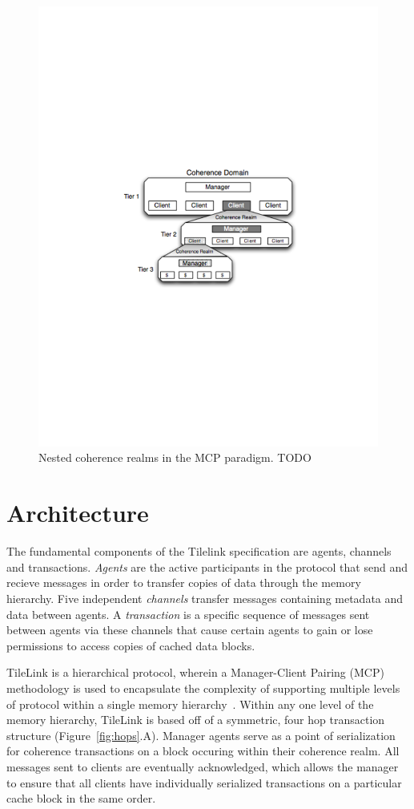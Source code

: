 \begin{figure}[t!]
\centering
\includegraphics[width=0.8\columnwidth]{tilelink/figures/mcp-realm.pdf}
\caption{Nested coherence realms in the MCP paradigm. TODO }
\label{fig:mcp}
\end{figure}

\section{Architecture}
\label{s.arch}

The fundamental components of the Tilelink specification are agents, channels and transactions.
{\em Agents} are the active participants in the protocol that send and recieve messages in order to transfer copies of data through the memory hierarchy.
Five independent {\em channels} transfer messages containing metadata and data between agents.
A {\em transaction} is a specific sequence of messages sent between agents via these channels
that cause certain agents to gain or lose permissions to access copies of cached data blocks.

TileLink is a hierarchical protocol, wherein a Manager-Client Pairing (MCP) methodology is used to encapsulate the complexity of supporting
multiple levels of protocol within a single memory hierarchy~\cite{beu2011manager}.
Within any one level of the memory hierarchy, TileLink is based off of a symmetric, four hop transaction structure (Figure~\ref{fig:hops}.A).
Manager agents serve as a point of serialization for coherence transactions on a block occuring within their coherence realm.
All messages sent to clients are eventually acknowledged, which allows the manager to ensure that all clients have
individually serialized transactions on a particular cache block in the same order.

